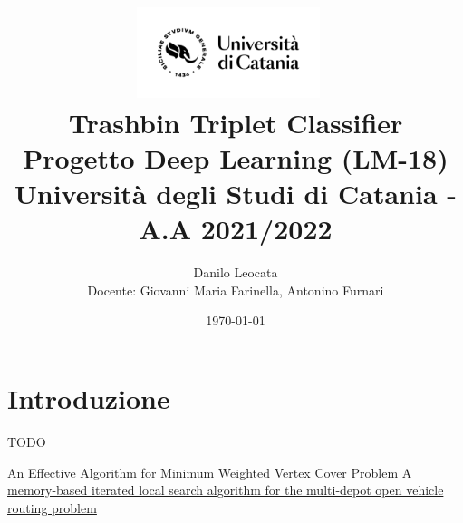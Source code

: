 \documentclass[11pt]{article}
\title{ %
\includegraphics[width=0.4\textwidth]{UniCT-Logo-Nero}~\\
Trashbin Triplet Classifier \\ 
\large Progetto Deep Learning (LM-18) \\ Università degli Studi di Catania - A.A 2021/2022 \\
}
\author{ Danilo Leocata \\ Docente: Giovanni Maria Farinella, Antonino Furnari}
\date{\today}
\begin{document}
\maketitle	
\pagebreak


\section{Introduzione}

TODO

\pagebreak

\begin{thebibliography}{5}


 \href{https://www.researchgate.net/publication/242463011_An_Effective_Algorithm_for_Minimum_Weighted_Vertex_Cover_problem}{An Effective Algorithm for Minimum Weighted Vertex Cover Problem}
 \href{https://www.sciencedirect.com/science/article/abs/pii/S0377221720300278}{A memory-based iterated local search algorithm for the multi-depot open vehicle routing problem}

\end{thebibliography}


\pagebreak
\end{document}
